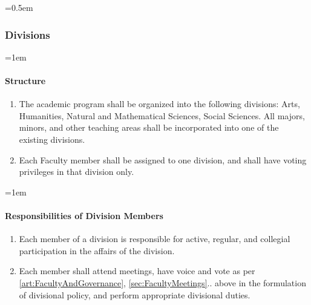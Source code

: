 \documentclass{manual}
\let\oldsubsubsection\subsubsection
\renewcommand\subsubsection{\leftskip=0.5em\oldsubsubsection}
\let\oldparagraph\paragraph
\renewcommand\paragraph{\leftskip=1em\oldparagraph}
\newcommand{\itemLevelA}{\alph*.}
\newcommand{\itemRefA}{\alph*}
\begin{document}
\subsubsection{Divisions}\label{sub:Divisions}
\paragraph{Structure}
\begin{enumerate}[label=\itemLevelA,ref=\itemRefA]
\item The academic program shall be organized into the following divisions: Arts, Humanities, Natural and Mathematical Sciences, Social Sciences. All majors, minors, and other teaching areas shall be incorporated into one of the existing divisions.
\item Each Faculty member shall be assigned to one division, and shall have voting privileges in that division only.
\end{enumerate}

\paragraph{Responsibilities of Division Members}
\begin{enumerate}[label=\itemLevelA,ref=\itemRefA]
\item Each member of a division is responsible for active, regular, and collegial participation in the affairs of the division.
\item Each member shall attend meetings, have voice and vote as per \cref{art:FacultyAndGovernance}, \cref{sec:FacultyMeetings}.. above in the formulation of divisional policy, and perform appropriate divisional duties.
\end{enumerate}

\end{document}
